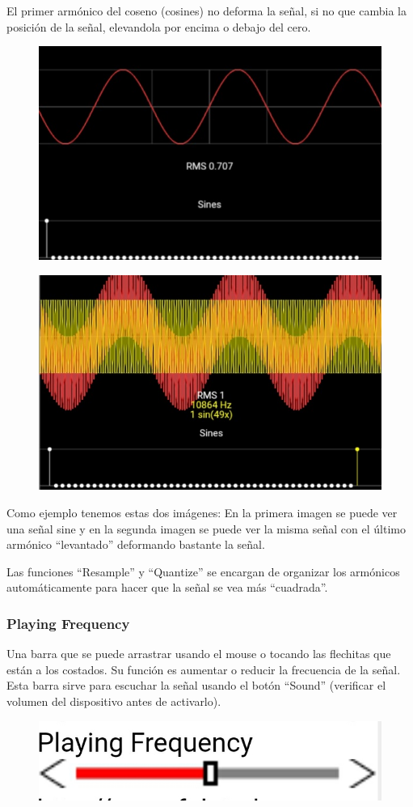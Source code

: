 \documentclass[../main.tex]{subfiles}
\begin{document}
	El primer armónico del coseno (cosines) no deforma la señal, si no que cambia la
	posición de la señal, elevandola por encima o debajo del cero. 
	\begin{figure}[H]
		\includegraphics[width= 0.6 \textwidth]{imagen17.jpg}
		\centering
	\end{figure}
	\begin{figure}[H]
		\includegraphics[width= 0.6 \textwidth]{imagen18.jpg}
		\centering
	\end{figure}
	Como ejemplo tenemos estas dos imágenes:
	En la primera imagen se puede ver una señal sine y en la segunda imagen se puede ver
	la misma señal con el último armónico “levantado” deformando bastante la señal. 

	Las funciones “Resample” y “Quantize” se encargan de organizar los armónicos
	automáticamente para hacer que la señal se vea más “cuadrada”.

	\subsubsection{Playing Frequency}
	Una barra que se puede arrastrar usando el mouse o tocando las flechitas que están a
	los costados. Su función es aumentar o reducir la frecuencia de la señal. 
	Esta barra sirve para escuchar la señal usando el botón ``Sound''
	(verificar el volumen del dispositivo antes de activarlo). 
	\begin{figure}[H]
		\includegraphics[width= 0.6 \textwidth]{imagen19.jpg}
		\centering
	\end{figure}
\end{document}
